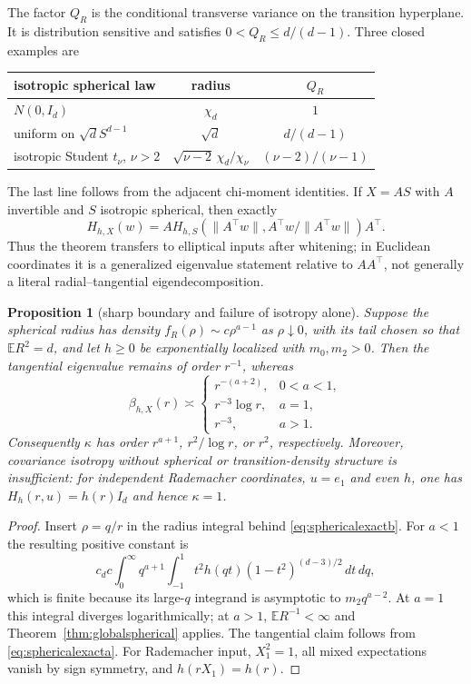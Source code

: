 \documentclass[11pt]{article}
\newtheorem{proposition}[theorem]{Proposition}
\newcommand{\E}{\mathbb E}
\begin{document}
The factor $Q_R$ is the conditional transverse variance on the transition hyperplane.  It is distribution
sensitive and satisfies $0<Q_R\le d/(d-1)$.  Three closed examples are
\begin{center}
\begin{tabular}{lcc}
\toprule
isotropic spherical law & radius & $Q_R$\\
\midrule
$N(0,I_d)$ & $\chi_d$ & $1$\\
uniform on $\sqrt dS^{d-1}$ & $\sqrt d$ & $d/(d-1)$\\
isotropic Student $t_\nu$, $\nu>2$ & $\sqrt{\nu-2}\,\chi_d/\chi_\nu$ & $(\nu-2)/(\nu-1)$\\
\bottomrule
\end{tabular}
\end{center}
The last line follows from the adjacent chi-moment identities.  If $X=AS$ with $A$ invertible and $S$ isotropic
spherical, then exactly
\[
 H_{h,X}(w)=A H_{h,S}(\lVert A^\top w\rVert,A^\top w/\lVert A^\top w\rVert)A^\top.
\]
Thus the theorem transfers to elliptical inputs after whitening; in Euclidean coordinates it is a generalized
eigenvalue statement relative to $AA^\top$, not generally a literal radial--tangential eigendecomposition.

\begin{proposition}[sharp boundary and failure of isotropy alone]
\label{prop:radialphase}
Suppose the spherical radius has density $f_R(\rho)\sim c\rho^{a-1}$ as $\rho\downarrow0$, with its tail chosen
so that $\E R^2=d$, and let $h\ge0$ be exponentially localized with $m_0,m_2>0$.  Then the tangential eigenvalue
remains of order $r^{-1}$, whereas
\[
 \beta_{h,X}(r)\asymp
 \begin{cases}
 r^{-(a+2)},&0<a<1,\\
 r^{-3}\log r,&a=1,\\
 r^{-3},&a>1.
 \end{cases}
\]
Consequently $\kappa$ has order $r^{a+1}$, $r^2/\log r$, or $r^2$, respectively.  Moreover, covariance
isotropy without spherical or transition-density structure is insufficient: for independent Rademacher
coordinates, $u=e_1$ and even $h$, one has $H_h(r,u)=h(r)I_d$ and hence $\kappa=1$.
\end{proposition}

\begin{proof}
Insert $\rho=q/r$ in the radius integral behind \eqref{eq:sphericalexactb}.  For $a<1$ the resulting positive
constant is
\[
 c_dc\int_0^\infty q^{a+1}\!\int_{-1}^1
 t^2h(qt)(1-t^2)^{(d-3)/2}\,dt\,dq,
\]
which is finite because its large-$q$ integrand is asymptotic to $m_2q^{a-2}$.  At $a=1$ this integral diverges
logarithmically; at $a>1$, $\E R^{-1}<\infty$ and Theorem~\ref{thm:globalspherical} applies.  The tangential claim
follows from \eqref{eq:sphericalexacta}.  For Rademacher input, $X_1^2=1$, all mixed expectations vanish by
sign symmetry, and $h(rX_1)=h(r)$.
\end{proof}
\end{document}
